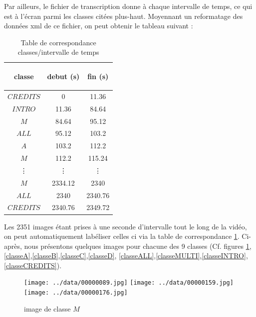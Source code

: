 \documentclass{book}
\begin{document}
Par ailleurs, le fichier de transcription donne à chaque intervalle de temps, ce qui est à l'écran parmi les classes citées plus-haut. 
Moyennant un reformatage des données xml de ce fichier, on peut obtenir le tableau suivant :

\begin{table}[H]
\begin{center}
\begin{tabular}{|c|c|c|}
\hline
\begin{bf}classe\end{bf} & \begin{bf}debut (s)\end{bf} & \begin{bf}fin (s)\end{bf} \\
\hline
$CREDITS$	& 0 & 11.36 \\
\hline
$INTRO$   & 11.36	& 84.64 \\
\hline
$M$	& 84.64	& 95.12 \\
\hline
$ALL$	& 95.12	& 103.2 \\
\hline
$A$	& 103.2	& 112.2 \\
\hline
$M$	& 112.2	& 115.24 \\
\hline
\vdots & \vdots &\vdots \\
\hline
$M$	& 2334.12 & 2340 \\
\hline
$ALL$	& 2340 & 2340.76 \\
\hline
$CREDITS$	& 2340.76 & 2349.72 \\
\hline
\end{tabular}
\end{center}
\caption{Table de correspondance classes/intervalle de temps}
\label{Table correspondance classe/temps}
\end{table}
\clearpage

Les 2351 images étant prises à une seconde d'intervalle tout le long de la vidéo, on peut automatiquement labéliser celles ci via la table de
correspondance \ref{Table correspondance classe/temps}.
Ci-après, nous présentons quelques images pour chacune des 9 classes (Cf. figures \ref{classeM},\ref{classeA},\ref{classeB},\ref{classeC},\ref{classeD},
\ref{classeALL},\ref{classeMULTI},\ref{classeINTRO},\ref{classeCREDITS}).
\begin{figure}[H]
\begin{center}
\texttt{[image: ../data/00000089.jpg]}
\texttt{[image: ../data/00000159.jpg]}
\texttt{[image: ../data/00000176.jpg]}
\end{center}
\caption{image de classe $M$}
\label{classeM}
\end{figure}
\end{document}
